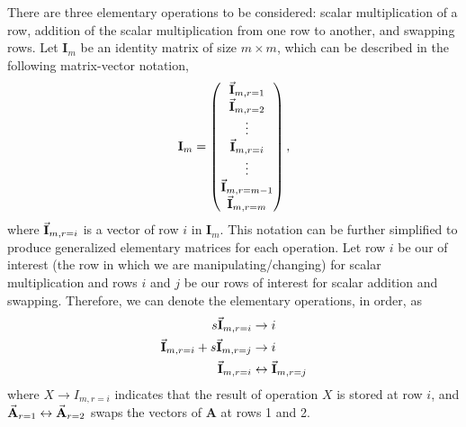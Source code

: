 \documentclass[12pt]{article}
\newcommand{\mat}[1]{\mathbf{#1}}
\begin{document}
There are three elementary operations to be considered: scalar multiplication of a row, addition of the scalar multiplication from one row to another, and swapping rows. Let $\mat{I}_{m}$ be an identity matrix of size $m \times m$, which can be described in the following matrix-vector notation,
\begin{equation*}
  \mat{I}_{m} = \begin{pmatrix}
    \va{I}_{m,r=1} \\
    \va{I}_{m,r=2} \\
    \vdots \\
    \va{I}_{m,r=i} \\
    \vdots \\
    \va{I}_{m,r=m-1} \\
    \va{I}_{m,r=m}
  \end{pmatrix},
\end{equation*}
where $\va{I}_{m,r=i}$ is a vector of row $i$ in $\mat{I}_{m}$. This notation can be further simplified to produce generalized elementary matrices for each operation. Let row $i$ be our of interest (the row in which we are manipulating/changing) for scalar multiplication and rows $i$ and $j$ be our rows of interest for scalar addition and swapping. Therefore, we can denote the elementary operations, in order, as
\begin{align*}
s\va{I}_{m,r=i} &\to i \\
\va{I}_{m,r=i} + s\va{I}_{m,r=j} &\to i \\
\va{I}_{m,r=i} &\leftrightarrow \va{I}_{m,r=j}
\end{align*}
where $X \to I_{m,r=i}$ indicates that the result of operation $X$ is stored at row $i$, and $\va{A}_{r=1} \leftrightarrow \va{A}_{r=2}$ swaps the vectors of $\mat{A}$ at rows 1 and 2.
\end{document}
